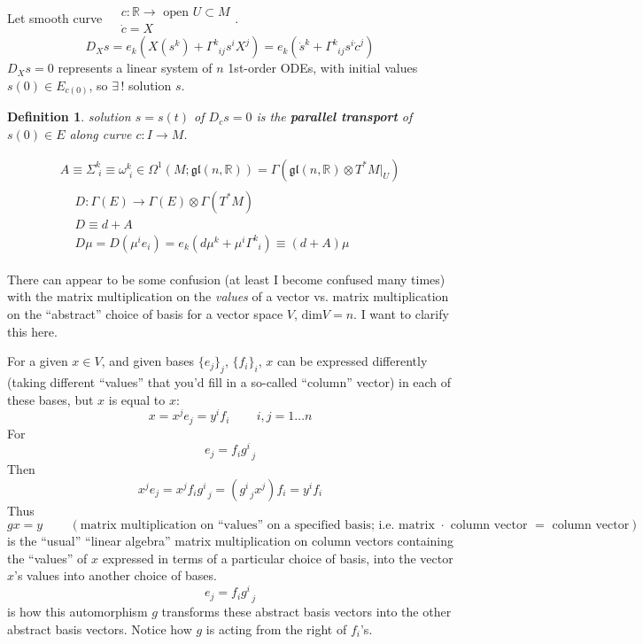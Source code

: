 \documentclass[10pt]{amsart}
\newtheorem{definition}{Definition}
\begin{document}
\begin{multicols*}{2}
Let smooth curve $\begin{aligned} & c: \mathbb{R} \to \text{ open } U \subset M \\ & \dot{c} = X \end{aligned}$.
\[
D_X s = e_k(X(s^k) + \Gamma^k_{ \; \; ij} s^i X^j ) = e_k (\dot{s}^k + \Gamma^k_{ \; \; ij} s^i \dot{c}^j )
\]  
$D_Xs =0$ represents a linear system of $n$ 1st-order ODEs, with initial values $s(0) \in E_{c(0)}$, so $\exists \, !$ solution $s$.  

\begin{definition}
  solution $s = s(t) $ of $D_{\dot{c}}s =0$ is the \textbf{parallel transport } of $s(0) \in E$ along curve $c:I \to M$.  
\end{definition}







 
\begin{equation}
  \begin{gathered}
    A \equiv \Sigma^k_{ \, \, i} \equiv \omega^k_{ \, \, i} \in \Omega^1(M;\mathfrak{gl}(n,\mathbb{R})) = \Gamma(\mathfrak{gl}(n,\mathbb{R}) \otimes T^* \left. M \right|_U ) \\ 
\begin{aligned}
&    D: \Gamma(E) \to \Gamma(E) \otimes \Gamma(T^*M) \\
&    D \equiv d + A \\
&    D\mu = D(\mu^i e_i) = e_k(d\mu^k + \mu^i \Gamma^k_{ \; \; i}) \equiv (d+A) \mu  
\end{aligned}
\end{gathered}
\end{equation}



There can appear to be some confusion (at least I become confused many times) with the matrix multiplication on the \emph{values} of a vector vs. matrix multiplication on the ``abstract'' choice of basis for a vector space $V$, $\text{dim}V = n$.  I want to clarify this here.

For a given $x \in V$, and given bases $\lbrace e_j \rbrace_j$, $\lbrace f_i \rbrace_i$, $x$ can be expressed differently (taking different ``values'' that you'd fill in a so-called ``column'' vector) in each of these bases, but $x$ is equal to $x$:
\[
x = x^j e_j = y^i f_i \qquad \, i,j = 1 \dots n 
\]
For
\[
e_j = f_i g^i_{ \; \; j }
\]
Then
\[
x^j e_j = x^j f_i g^i_{ \; \; j} = (g^i_{ \; \; j}x^j )f_i = y^i f_i
\]
Thus
\[
gx = y \qquad \, (\text{matrix multiplication on ``values'' on a specified basis; i.e. matrix $\cdot$ column vector $=$ column vector})
\]
is the ``usual'' ``linear algebra'' matrix multiplication on column vectors containing the ``values'' of $x$ expressed in terms of a particular choice of basis, into the vector $x$'s values into another choice of bases.  
\[
e_j = f_i g^i_{ \; \; j}
\]
is how this automorphism $g$ transforms these abstract basis vectors into the other abstract basis vectors. Notice how $g$ is acting from the right of $f_i$'s.    


\end{multicols*}
\end{document}
